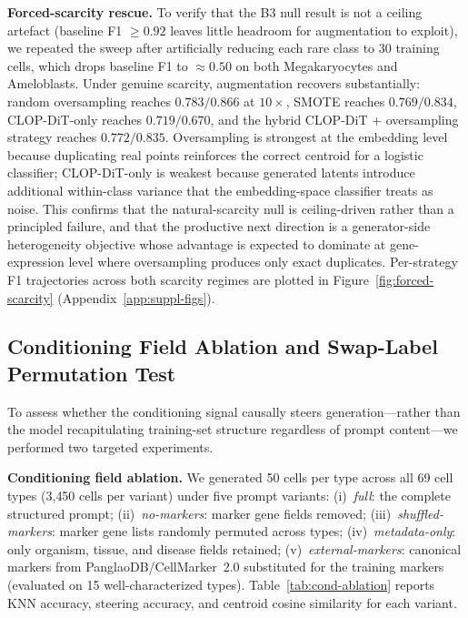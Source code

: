 \documentclass[11pt,a4paper]{article}
\begin{document}
\textbf{Forced-scarcity rescue.} To verify that the B3 null result is not a ceiling artefact (baseline F1 $\geq 0.92$ leaves little headroom for augmentation to exploit), we repeated the sweep after artificially reducing each rare class to 30 training cells, which drops baseline F1 to $\approx 0.50$ on both Megakaryocytes and Ameloblasts. Under genuine scarcity, augmentation recovers substantially: random oversampling reaches $0.783/0.866$ at $10\times$, SMOTE reaches $0.769/0.834$, CLOP-DiT-only reaches $0.719/0.670$, and the hybrid CLOP-DiT + oversampling strategy reaches $0.772/0.835$. Oversampling is strongest at the embedding level because duplicating real points reinforces the correct centroid for a logistic classifier; CLOP-DiT-only is weakest because generated latents introduce additional within-class variance that the embedding-space classifier treats as noise. This confirms that the natural-scarcity null is ceiling-driven rather than a principled failure, and that the productive next direction is a generator-side heterogeneity objective whose advantage is expected to dominate at gene-expression level where oversampling produces only exact duplicates. Per-strategy F1 trajectories across both scarcity regimes are plotted in Figure~\ref{fig:forced-scarcity} (Appendix~\ref{app:suppl-figs}).

\subsection{Conditioning Field Ablation and Swap-Label Permutation Test}\label{sec:cond-ablation}

To assess whether the conditioning signal causally steers generation---rather than the model recapitulating training-set structure regardless of prompt content---we performed two targeted experiments.

\textbf{Conditioning field ablation.} We generated 50 cells per type across all 69 cell types (3{,}450 cells per variant) under five prompt variants: (i)~\emph{full}: the complete structured prompt; (ii)~\emph{no-markers}: marker gene fields removed; (iii)~\emph{shuffled-markers}: marker gene lists randomly permuted across types; (iv)~\emph{metadata-only}: only organism, tissue, and disease fields retained; (v)~\emph{external-markers}: canonical markers from PanglaoDB/CellMarker~2.0 substituted for the training markers (evaluated on 15 well-characterized types). Table~\ref{tab:cond-ablation} reports KNN accuracy, steering accuracy, and centroid cosine similarity for each variant.
\end{document}
